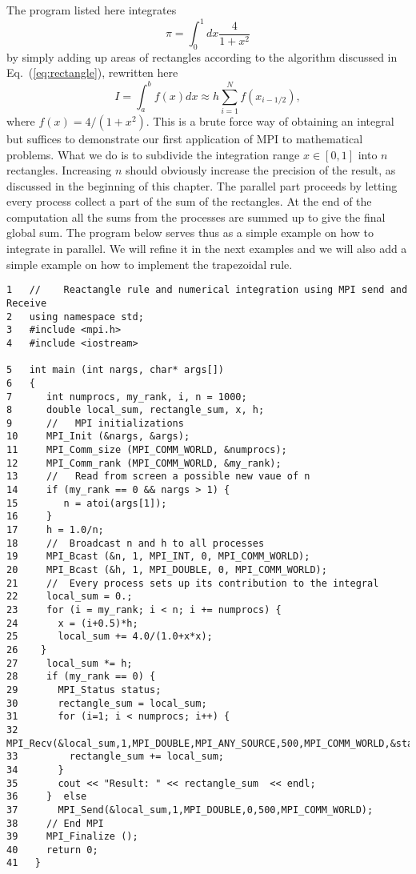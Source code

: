 The program listed here integrates \[  \pi = \int_0^1 dx \frac{4}{1+x^2} \] by simply adding up areas of
rectangles according to the algorithm discussed in Eq.~(\ref{eq:rectangle}), rewritten here
\[
   I=\int_a^bf(x) dx \approx  h\sum_{i=1}^N f(x_{i-1/2}), 
\]
where $f(x)=4/(1+x^2)$.
This is a brute force way of obtaining an integral but suffices to demonstrate our first 
application of MPI to mathematical problems. What we do is to subdivide the integration
range $x\in [0,1]$ into $n$ rectangles. Increasing $n$ should obviously increase the precision of the result,
as discussed in the beginning of this chapter. 
The parallel part proceeds by letting every process collect a part of the sum of the rectangles. 
At the end of the
computation all the sums from the processes are summed up to give the final global sum.
The program below serves thus as a simple
example on how to integrate in parallel.  We will refine it in the next examples and we will also add
a simple example on how to implement the trapezoidal rule. 
\lstset{language=c++}
\begin{lstlisting}[title={\url{http://folk.uio.no/mhjensen/compphys/programs/chapter04/program5.cpp}}]
1   //    Reactangle rule and numerical integration using MPI send and Receive
2   using namespace std;
3   #include <mpi.h>
4   #include <iostream>

5   int main (int nargs, char* args[])
6   {
7      int numprocs, my_rank, i, n = 1000;
8      double local_sum, rectangle_sum, x, h;
9      //   MPI initializations
10     MPI_Init (&nargs, &args);
11     MPI_Comm_size (MPI_COMM_WORLD, &numprocs);
12     MPI_Comm_rank (MPI_COMM_WORLD, &my_rank);
13     //   Read from screen a possible new vaue of n
14     if (my_rank == 0 && nargs > 1) {
15        n = atoi(args[1]);
16     }
17     h = 1.0/n;
18     //  Broadcast n and h to all processes
19     MPI_Bcast (&n, 1, MPI_INT, 0, MPI_COMM_WORLD);
20     MPI_Bcast (&h, 1, MPI_DOUBLE, 0, MPI_COMM_WORLD);
21     //  Every process sets up its contribution to the integral
22     local_sum = 0.;
23     for (i = my_rank; i < n; i += numprocs) {
24       x = (i+0.5)*h;
25       local_sum += 4.0/(1.0+x*x);
26    }
27     local_sum *= h;
28     if (my_rank == 0) {
29       MPI_Status status;
30       rectangle_sum = local_sum;
31       for (i=1; i < numprocs; i++) {
32         MPI_Recv(&local_sum,1,MPI_DOUBLE,MPI_ANY_SOURCE,500,MPI_COMM_WORLD,&status);
33         rectangle_sum += local_sum;
34       }
35       cout << "Result: " << rectangle_sum  << endl;
36     }  else
37       MPI_Send(&local_sum,1,MPI_DOUBLE,0,500,MPI_COMM_WORLD);
38     // End MPI
39     MPI_Finalize ();
40     return 0;
41   }
\end{lstlisting}
